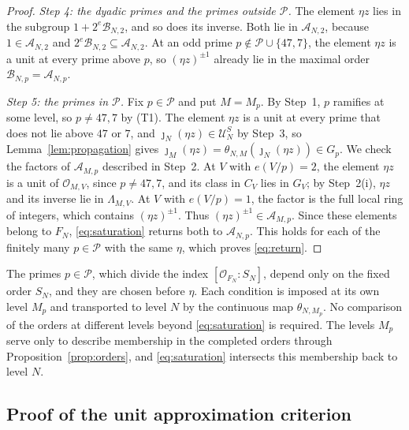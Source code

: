 \documentclass[11pt]{article}
\theoremstyle{plain}
\theoremstyle{definition}
\theoremstyle{remark}
\newcommand{\OO}{\mathcal O}
\begin{document}
\begin{proof}
\emph{Step 4: the dyadic primes and the primes outside $\mathcal P$.}  The
element $\eta z$ lies in the subgroup $1+2^e\mathcal B_{N,2}$, and so does
its inverse.  Both lie in $\mathcal A_{N,2}$, because
$1\in\mathcal A_{N,2}$ and $2^e\mathcal B_{N,2}\subseteq\mathcal A_{N,2}$.
At an odd prime $p\notin\mathcal P\cup\{47,7\}$, the element $\eta z$ is a
unit at every prime above $p$, so $(\eta z)^{\pm1}$ already lie in the
maximal order $\mathcal B_{N,p}=\mathcal A_{N,p}$.

\emph{Step 5: the primes in $\mathcal P$.}  Fix $p\in\mathcal P$ and put
$M=M_p$.  By Step~1, $p$ ramifies at some level, so $p\ne47,7$ by (T1).
The element $\eta z$ is a unit at every prime that does not lie above
$47$ or $7$, and $\jmath_N(\eta z)\in\mathcal U_N^S$ by Step~3, so
Lemma~\ref{lem:propagation} gives
$\jmath_M(\eta z)=\theta_{N,M}(\jmath_N(\eta z))\in G_p$.  We check the
factors of $\mathcal A_{M,p}$ described in Step~2.  At $V$ with
$e(V/p)=2$, the element $\eta z$ is a unit of $\OO_{M,V}$, since
$p\ne47,7$, and its class in $C_V$ lies in $G_V$; by Step~2(i), $\eta z$
and its inverse lie in $\Lambda_{M,V}$.  At $V$ with $e(V/p)=1$, the factor
is the full local ring of integers, which contains $(\eta z)^{\pm1}$.
Thus $(\eta z)^{\pm1}\in\mathcal A_{M,p}$.  Since these elements belong to
$F_N$, \eqref{eq:saturation} returns both to $\mathcal A_{N,p}$.  This
holds for each of the finitely many $p\in\mathcal P$ with the same $\eta$,
which proves \eqref{eq:return}.
\end{proof}

The primes $p\in\mathcal P$, which divide the index
$[\OO_{F_N}:S_N]$, depend only on the fixed order $S_N$, and they are
chosen before $\eta$.  Each condition is imposed at its own level $M_p$
and transported to level $N$ by the continuous map $\theta_{N,M_p}$.  No
comparison of the orders at different levels beyond \eqref{eq:saturation}
is required.  The levels $M_p$ serve only to describe membership in the
completed orders through Proposition~\ref{prop:orders}, and
\eqref{eq:saturation} intersects this membership back to level $N$.

\subsection{Proof of the unit approximation criterion}\label{sec:joint-proof}
\end{document}
